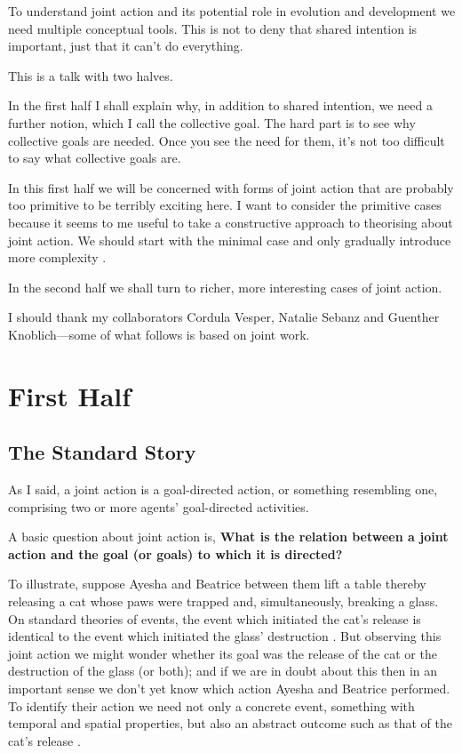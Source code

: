 \documentclass[12pt,a4paper]{extarticle}
\begin{document}
To understand joint action and its potential role in evolution and development we need multiple conceptual tools.  This is not to deny that shared intention is important, just that it can't do everything.

This is a talk with two halves.  

In the first half I shall explain why, in addition to shared intention, we need a further notion, which I call the collective goal.  The hard part is to see why collective goals are needed.  Once you see the need for them, it's not too difficult to say what collective goals are.

In this first half we will be concerned with forms of joint action that are probably too primitive to be terribly exciting here.  
I want to consider the primitive cases because it seems to me useful to take a constructive approach to theorising about joint action. 
We should start with the minimal case and only gradually introduce more complexity \citep{vesper_minimal_2010}.   

In the second half we shall turn to richer, more interesting cases of joint action.

I should thank my collaborators Cordula Vesper, Natalie Sebanz and Guenther Knoblich---some of what follows is based on joint work.

\section{First Half}



\subsection{The Standard Story}

As I said, a joint action is a goal-directed action, or something resembling one, comprising two or more agents' goal-directed activities. 

A basic question about joint action is, 
\textbf{What is the relation between a joint action and the goal (or goals) to which it is directed?}  

To illustrate, suppose Ayesha and Beatrice between them lift a table thereby releasing a cat whose paws were trapped and,  simultaneously, breaking a glass.  On standard theories of events, the event which initiated the cat's release is identical to the event which initiated the glass' destruction \citep{Davidson:1969ie}.  But observing this joint action we might wonder whether its goal was the release of the cat or the destruction of the glass (or both); and if we are in doubt about this then in an important sense we don't yet know which action Ayesha and Beatrice performed.  To identify their action we need not only a concrete event, something with temporal and spatial properties, but also an abstract outcome such as that of the cat's release \citep{Davidson:1971fz}.
\end{document}
